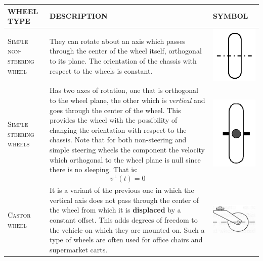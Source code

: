 \begin{table}
    \centering
    \begin{tabular}{m{5cm} m{9cm} m{2cm} }
        \textbf{WHEEL TYPE}&\textbf{DESCRIPTION}&\textbf{SYMBOL} \\
        \toprule
        {\textsc{Simple non-steering wheel}}&{They can rotate about an axis which passes  through the center of the wheel itself, orthogonal to its plane. The orientation of the chassis with respect to the wheels is constant.}&{\centering \includegraphics[scale=0.5]{img/simple_non_steering.png}} \\
        \midrule
        {\textsc{Simple steering wheels}}&{Has two axes of rotation, one that is orthogonal to the wheel plane, the other which is \textit{vertical} and goes through the center of the wheel. This provides the wheel with the possibility of changing the orientation with respect to the chassis. Note that for both non-steering and simple steering wheels the component the velocity which orthogonal to the wheel plane is null since there is no sleeping. That is: 
        \begin{equation*}
            v^{\perp}(t)=0
        \end{equation*}}&{\includegraphics[scale=0.5]{img/simple_steering.png}} \\
        \midrule
        {\textsc{Castor wheel}}&{It is a variant of the previous one in which the vertical axis does not pass through the center of the wheel from which it is \textbf{displaced} by a constant offset. This adds degrees of freedom to the vehicle on which they are mounted on. Such a type of wheels are often used for office chairs and supermarket carts.}&{\includegraphics[scale=0.5]{img/castor_wheel.png}} \\

\end{tabular}
\end{table}

